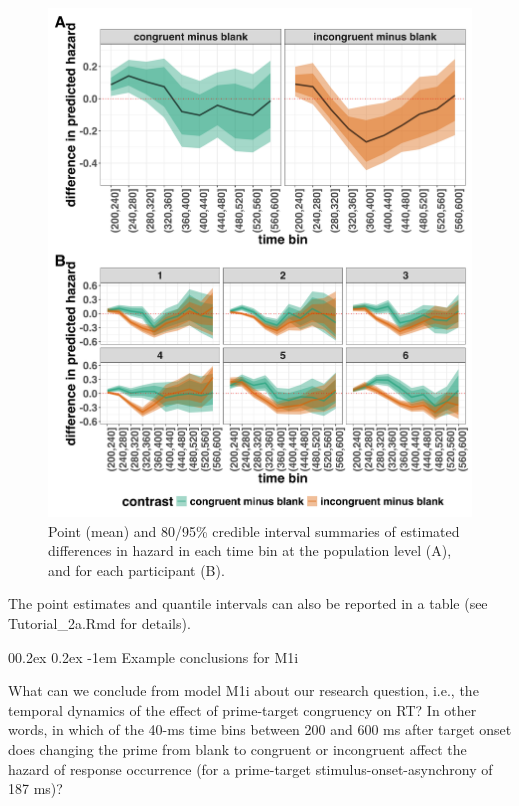 \documentclass[
  man, donotrepeattitle,floatsintext]{apa6}
\makeatletter
\let\oldparagraph\paragraph
\renewcommand{\paragraph}{
    \@ifstar
      \xxxParagraphStar
      \xxxParagraphNoStar
  }
\newcommand{\xxxParagraphStar}[1]{\oldparagraph*{#1}\mbox{}}
\newcommand{\xxxParagraphNoStar}[1]{\oldparagraph{#1}\mbox{}}
\renewcommand{\paragraph}{\@startsection{paragraph}{4}{\parindent}%
  {0\baselineskip \@plus 0.2ex \@minus 0.2ex}%
  {-1em}%
  {\normalfont\normalsize\bfseries\itshape\typesectitle}}
\makeatother
\begin{document}
\begin{figure}[H]

{\centering \includegraphics[width=0.8\linewidth,height=0.67\textheight,]{../Tutorial_2_Bayesian/figures/M1i_ame_combined} 

}

\caption{Point (mean) and 80/95\% credible interval summaries of estimated differences in hazard in each time bin at the population level (A), and for each participant (B).}\label{fig:plot-grand-ame-effects}
\end{figure}

The point estimates and quantile intervals can also be reported in a table (see Tutorial\_2a.Rmd for details).

\paragraph{Example conclusions for M1i}\label{example-conclusions-for-m1i}

What can we conclude from model M1i about our research question, i.e., the temporal dynamics of the effect of prime-target congruency on RT? In other words, in which of the 40-ms time bins between 200 and 600 ms after target onset does changing the prime from blank to congruent or incongruent affect the hazard of response occurrence (for a prime-target stimulus-onset-asynchrony of 187 ms)?
\end{document}
